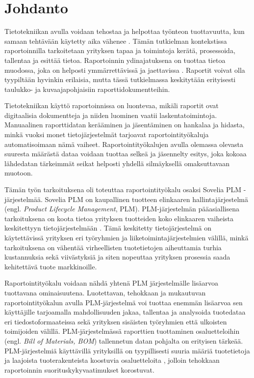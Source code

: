 \chapter{Johdanto} \label{Johdanto}

Tietotekniikan avulla voidaan tehostaa ja helpottaa työnteon tuottavuutta, kun samaan tehtävään käytetty aika vähenee \cite{rakovic_digital_2022}. Tämän tutkielman kontekstissa raportoinnilla tarkoitetaan yrityksen tapaa ja toimintoja kerätä, prosessoida, tallentaa ja esittää tietoa. Raportoinnin ydinajatuksena on tuottaa tietoa muodossa, joka on helposti ymmärrettävissä ja jaettavissa \cite{glockner_reports_2022}. Raportit voivat olla tyypiltään hyvinkin erilaisia, mutta tässä tutkielmassa keskitytään erityisesti taulukko- ja kuvaajapohjaisiin raporttidokumentteihin.
 
Tietotekniikan käyttö raportoinnissa on luontevaa, mikäli raportit ovat digitaalisia dokumentteja ja niiden luominen vaatii laskentatoimintoja. Manuaalinen raporttidatan kerääminen ja jäsentäminen on hankalaa ja hidasta, minkä vuoksi monet tietojärjestelmät tarjoavat raportointityökaluja automatisoimaan nämä vaiheet. Raportointityökalujen avulla olemassa olevasta suuresta määrästä dataa voidaan tuottaa selkeä ja jäsennelty esitys, joka kokoaa lähdedatan tärkeimmät seikat helposti yhdellä silmäyksellä omaksuttavaan muotoon.\cite{adhi_performance_2019}

Tämän työn tarkoituksena oli toteuttaa raportointityökalu osaksi Sovelia PLM -järjestelmää. Sovelia PLM on kaupallinen tuotteen elinkaaren hallintajärjestelmä  (engl. \textit{Product Lifecycle Management}, PLM)\cite{soveliaAboutSovelia}. PLM-järjestelmän pääasiallisena tarkoituksena on koota tietoa yrityksen tuotteiden koko elinkaaren vaiheista keskitettyyn tietojärjestelmään \cite{alemanni_key_2008}. Tämä keskitetty tietojärjestelmä on käytettävissä yrityksen eri työryhmien ja liiketoimintajärjestelmien välillä, minkä tarkoituksena on vähentää virheellisten tuotetietojen aiheuttamia turhia kustannuksia sekä viivästyksiä ja siten nopeuttaa yrityksen prosessia saada kehitettävä tuote markkinoille. \cite{alemanni_key_2008}

Raportointityökalu voidaan nähdä yhtenä PLM järjestelmälle lisäarvoa tuottavana ominaisuutena.\cite{german_challenge_2016} Luotettavan, tehokkaan ja mukautuvan raportointityökalun avulla PLM-järjestelmä voi tuottaa enemmän lisäarvoa sen käyttäjille tarjoamalla mahdollisuuden jakaa, tallentaa ja analysoida tuotedataa eri tiedostoformaateissa sekä yrityksen sisäisten työryhmien että ulkoisten toimijoiden välillä.\cite{german_challenge_2016} PLM-järjestelmässä raporttien tuottaminen osaluetteloihin (engl. \textit{Bill of Materials, BOM}) tallennetun datan pohjalta on erityisen tärkeää.\cite{german_challenge_2016} PLM-järjestelmiä käyttävillä yrityksillä on tyypillisesti suuria määriä tuotetietoja ja laajoista tuoterakenteista koostuvia osaluetteloita \cite{rohleder_requirements_2014}, jolloin tehokkaan raportoinnin suorituskykyvaatimukset korostuvat.

